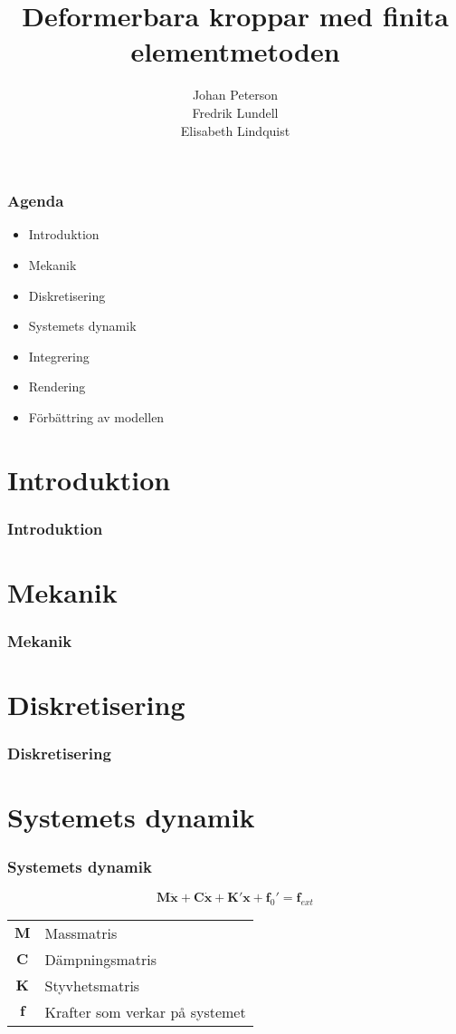 \documentclass{beamer}
\title{Deformerbara kroppar med finita elementmetoden}
\author{Johan Peterson\\Fredrik Lundell\\Elisabeth Lindquist}
\begin{document}
\begin{frame}
\maketitle
\end{frame}

\begin{frame}
\frametitle{Agenda}
\begin{itemize}
\item Introduktion
\item Mekanik
\item Diskretisering
\item Systemets dynamik
\item Integrering
\item Rendering
\item Förbättring av modellen
\end{itemize}

\end{frame}

\section{Introduktion}
\begin{frame}
\frametitle{Introduktion}
\end{frame}

\section{Mekanik}
\begin{frame}
\frametitle{Mekanik}
\end{frame}

\section{Diskretisering}
\begin{frame}
\frametitle{Diskretisering}
\end{frame}


\section{Systemets dynamik}
\begin{frame}
\frametitle{Systemets dynamik}
\begin{equation}
\mathbf{M\ddot{x}} + \mathbf{C\dot{x}} + \mathbf{K'x} + \mathbf{f}_0' = \mathbf{f}_{ext}
\end{equation}

\begin{center}
\begin{tabular}{c l}
$\mathbf{M}$ & Massmatris \\
$\mathbf{C}$ & Dämpningsmatris \\
$\mathbf{K}$ & Styvhetsmatris\\
$\mathbf{f}$ & Krafter som verkar på systemet \\
\end{tabular}
\end{center}
\end{frame}
\end{document}
